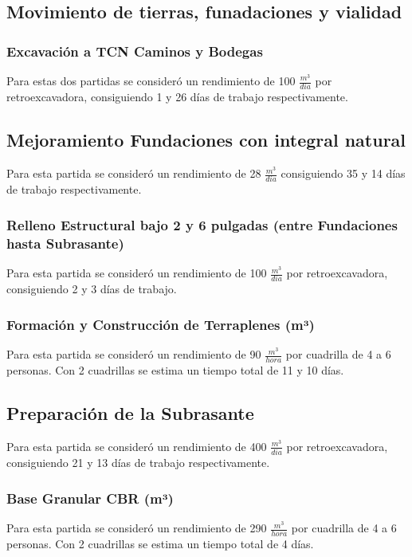 \documentclass{article} %
\begin{document}
\subsection{Movimiento de tierras, funadaciones y vialidad}
\subsubsection{Excavación a TCN Caminos y Bodegas}
Para estas dos partidas se consideró un rendimiento de 100 $\frac{m^3}{dia}$ por retroexcavadora, consiguiendo 1 y 26 días de trabajo respectivamente.

\subsection{Mejoramiento Fundaciones con integral natural}
Para esta partida se consideró un rendimiento de 28 $\frac{m^3}{dia}$ consiguiendo 35 y 14 días de trabajo respectivamente.

\subsubsection{Relleno Estructural bajo 2 y 6 pulgadas (entre Fundaciones hasta Subrasante)}
Para esta partida se consideró un rendimiento de 100 $\frac{m^3}{dia}$ por retroexcavadora, consiguiendo 2 y 3 días de trabajo.

\subsubsection{Formación y Construcción de Terraplenes (m³)}
Para esta partida se consideró un rendimiento de 90 $\frac{m^3}{hora}$ por cuadrilla de 4 a 6 personas. Con 2 cuadrillas se estima un tiempo total de 11 y 10 días.

\subsection{Preparación de la Subrasante}
Para esta partida se consideró un rendimiento de 400 $\frac{m^3}{dia}$ por retroexcavadora, consiguiendo 21 y 13 días de trabajo respectivamente.

\subsubsection{Base Granular CBR (m³)}
Para esta partida se consideró un rendimiento de 290 $\frac{m^3}{hora}$ por cuadrilla de 4 a 6 personas. Con 2 cuadrillas se estima un tiempo total de 4 días.
\end{document}
